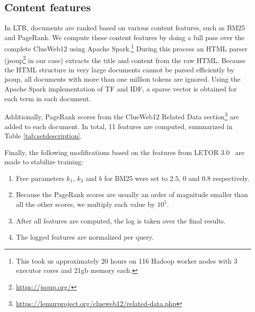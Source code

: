 \subsection{Content features} \label{sec:contentfeature}
In LTR, documents are ranked based on various content features, such as BM25 and PageRank.
We compute these content features by doing a full pass over the complete ClueWeb12 using Apache Spark.\footnote{This took us approximately 20 hours on 116 Hadoop worker nodes with 3 executor cores and 21gb memory each.}
During this process an HTML parser (jsoup\footnote{\url{https://jsoup.org/}} in our case) extracts the title and content from the raw HTML.
Because the HTML structure in very large documents cannot be parsed efficiently by jsoup, all documents with more than one million tokens are ignored.
Using the Apache Spark implementation of TF and IDF, a sparse vector is obtained for each term in each document.

Additionally, PageRank scores from the ClueWeb12 Related Data section\footnote{\url{https://lemurproject.org/clueweb12/related-data.php}} are added to each document.
In total, 11 features are computed, summarized in Table \ref{tab:setdescription}.

Finally, the following modifications based on the features from LETOR 3.0~\cite{qin2010letor} are made to stabilize training:
\begin{enumerate}  
\item Free parameters $k_1$, $k_3$ and $b$ for BM25 were set to $2.5$, $0$ and $0.8$ respectively. 
\item Because the PageRank scores are usually an order of magnitude smaller than all the other scores, we multiply each value by $10^5$.
\item After all features are computed, the log is taken over the final results.
\item The logged features are normalized per query.  
\end{enumerate}

